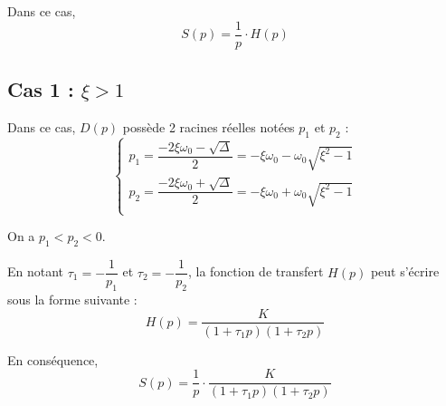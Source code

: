\documentclass[10pt,fleqn]{article} %
\begin{document}
Dans ce cas, 
$$
S(p)=\dfrac{1}{p}\cdot H(p)
$$
\subsection{Cas 1 : $\xi > 1$}



Dans ce cas, $D(p)$ possède 2 racines réelles notées $p_1$ et $p_2$ :
$$
\left\{
\begin{array}{l}
p_1 =
\dfrac{-2\xi\omega_0-\sqrt{\Delta}}{2}=-\xi\omega_0-\omega_0\sqrt{\xi^2-1}\\ 
p_2 =
\dfrac{-2\xi\omega_0+\sqrt{\Delta}}{2}=-\xi\omega_0+\omega_0\sqrt{\xi^2-1}\\ 
\end{array}
\right.
$$

On a $p_1<p_2<0$.

En notant $\tau_1=-\dfrac{1}{p_1}$ et $\tau_2=-\dfrac{1}{p_2}$, la fonction de
transfert $H(p)$ peut s'écrire sous la forme suivante :  
$$
H(p)=\dfrac{K}{\left(1+ \tau_1 p \right)\left(1+ \tau_2 p  \right)}
$$

En conséquence, 
$$
S(p)=\dfrac{1}{p}\cdot\dfrac{K}{\left(1+ \tau_1 p \right)\left(1+ \tau_2 p 
\right)} 
$$
\end{document}
